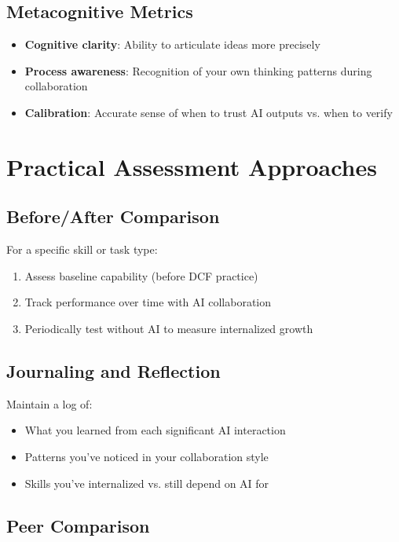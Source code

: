 \subsection{Metacognitive Metrics}

\begin{itemize}
    \item \textbf{Cognitive clarity}: Ability to articulate ideas more precisely
    \item \textbf{Process awareness}: Recognition of your own thinking patterns during collaboration
    \item \textbf{Calibration}: Accurate sense of when to trust AI outputs vs. when to verify
\end{itemize}

\section{Practical Assessment Approaches}

\subsection{Before/After Comparison}

For a specific skill or task type:
\begin{enumerate}
    \item Assess baseline capability (before DCF practice)
    \item Track performance over time with AI collaboration
    \item Periodically test without AI to measure internalized growth
\end{enumerate}

\subsection{Journaling and Reflection}

Maintain a log of:
\begin{itemize}
    \item What you learned from each significant AI interaction
    \item Patterns you've noticed in your collaboration style
    \item Skills you've internalized vs. still depend on AI for
\end{itemize}

\subsection{Peer Comparison}

